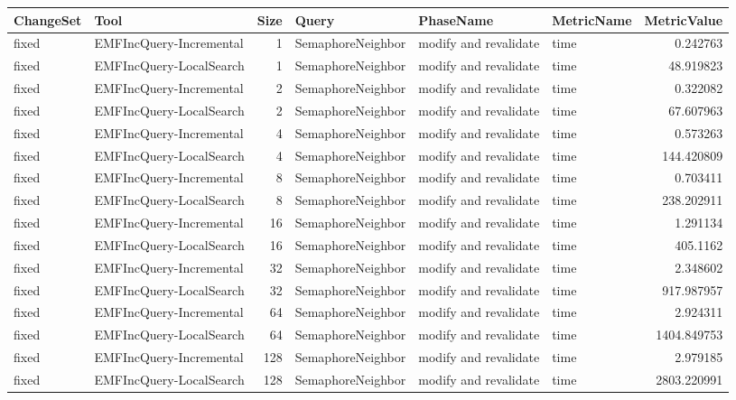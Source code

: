 \begin{table}
\centering
\footnotesize
\begin{tabular}{| l | l | r | l | l | l | r |}
\hline
\sf ChangeSet & \sf Tool & \sf Size & \sf Query & \sf PhaseName & \sf MetricName & \sf MetricValue\\\hline


fixed & EMFIncQuery-Incremental & 1 & SemaphoreNeighbor & modify and revalidate & time & 0.242763\\\hline
fixed & EMFIncQuery-LocalSearch & 1 & SemaphoreNeighbor & modify and revalidate & time & 48.919823\\\hline
fixed & EMFIncQuery-Incremental & 2 & SemaphoreNeighbor & modify and revalidate & time & 0.322082\\\hline
fixed & EMFIncQuery-LocalSearch & 2 & SemaphoreNeighbor & modify and revalidate & time & 67.607963\\\hline
fixed & EMFIncQuery-Incremental & 4 & SemaphoreNeighbor & modify and revalidate & time & 0.573263\\\hline
fixed & EMFIncQuery-LocalSearch & 4 & SemaphoreNeighbor & modify and revalidate & time & 144.420809\\\hline
fixed & EMFIncQuery-Incremental & 8 & SemaphoreNeighbor & modify and revalidate & time & 0.703411\\\hline
fixed & EMFIncQuery-LocalSearch & 8 & SemaphoreNeighbor & modify and revalidate & time & 238.202911\\\hline
fixed & EMFIncQuery-Incremental & 16 & SemaphoreNeighbor & modify and revalidate & time & 1.291134\\\hline
fixed & EMFIncQuery-LocalSearch & 16 & SemaphoreNeighbor & modify and revalidate & time & 405.1162\\\hline
fixed & EMFIncQuery-Incremental & 32 & SemaphoreNeighbor & modify and revalidate & time & 2.348602\\\hline
fixed & EMFIncQuery-LocalSearch & 32 & SemaphoreNeighbor & modify and revalidate & time & 917.987957\\\hline
fixed & EMFIncQuery-Incremental & 64 & SemaphoreNeighbor & modify and revalidate & time & 2.924311\\\hline
fixed & EMFIncQuery-LocalSearch & 64 & SemaphoreNeighbor & modify and revalidate & time & 1404.849753\\\hline
fixed & EMFIncQuery-Incremental & 128 & SemaphoreNeighbor & modify and revalidate & time & 2.979185\\\hline
fixed & EMFIncQuery-LocalSearch & 128 & SemaphoreNeighbor & modify and revalidate & time & 2803.220991\\\hline

\end{tabular}
\end{table}
